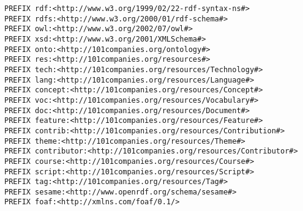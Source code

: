 {\small

\begin{verbatim}
PREFIX rdf:<http://www.w3.org/1999/02/22-rdf-syntax-ns#>
PREFIX rdfs:<http://www.w3.org/2000/01/rdf-schema#>
PREFIX owl:<http://www.w3.org/2002/07/owl#>
PREFIX xsd:<http://www.w3.org/2001/XMLSchema#>
PREFIX onto:<http://101companies.org/ontology#>
PREFIX res:<http://101companies.org/resources#>
PREFIX tech:<http://101companies.org/resources/Technology#>
PREFIX lang:<http://101companies.org/resources/Language#>
PREFIX concept:<http://101companies.org/resources/Concept#>
PREFIX voc:<http://101companies.org/resources/Vocabulary#>
PREFIX doc:<http://101companies.org/resources/Document#>
PREFIX feature:<http://101companies.org/resources/Feature#>
PREFIX contrib:<http://101companies.org/resources/Contribution#>
PREFIX theme:<http://101companies.org/resources/Theme#>
PREFIX contributor:<http://101companies.org/resources/Contributor#>
PREFIX course:<http://101companies.org/resources/Course#>
PREFIX script:<http://101companies.org/resources/Script#>
PREFIX tag:<http://101companies.org/resources/Tag#>
PREFIX sesame:<http://www.openrdf.org/schema/sesame#>
PREFIX foaf:<http://xmlns.com/foaf/0.1/>
\end{verbatim}

}


